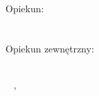 
{\large  Opiekun:}\\[.5cm]
{\large \bfseries{\supname}}\\[.5cm]
{\departmentname}\\[1cm]


\ifdefined\supExt
    {\large Opiekun zewnętrzny:}\\[.5cm]
    {\large \bfseries{\supExt}}\\[.5cm]
    \departmentnameExt
\fi

~\vfill
\placesubmit, \yearsubmit\\

\endgroup

